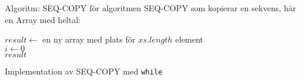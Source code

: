 \begin{Slide}{Algoritm: SEQ-COPY}
 för algoritmen SEQ-COPY som kopierar en sekvens, här en Array med heltal:\\
\noindent\hrulefill
\begin{algorithm}[H]
 $result \leftarrow$ en ny array med plats för $xs.length$ element\\
 $i \leftarrow 0$  \\
 \Return $result$
\end{algorithm}
\noindent\hrulefill
\end{Slide}

\begin{Slide}{Implementation av SEQ-COPY med \texttt{while}}

\end{Slide}

% 
%
% 
